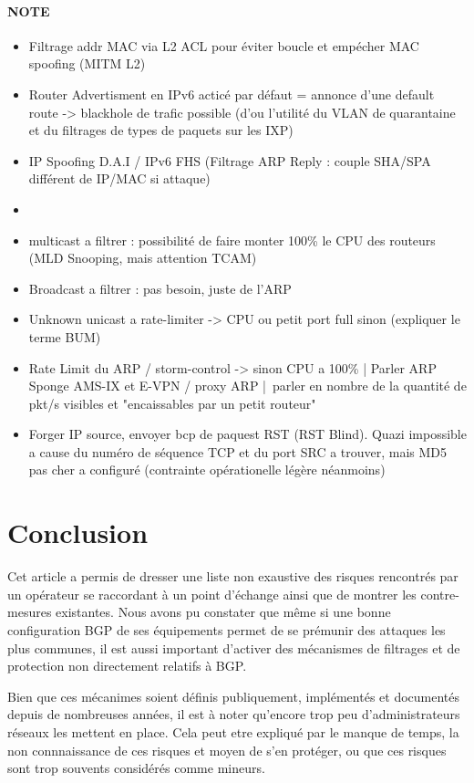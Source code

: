 \paragraph{NOTE}
\begin{itemize}
\item Filtrage addr MAC via L2 ACL pour éviter boucle et empécher MAC spoofing (MITM L2)
\item Router Advertisment en IPv6 acticé par défaut = annonce d'une default route -> blackhole de trafic possible (d'ou l'utilité du VLAN de quarantaine et du filtrages de types de paquets sur les IXP)
\item IP Spoofing D.A.I / IPv6 FHS (Filtrage ARP Reply : couple SHA/SPA différent de IP/MAC si attaque)
\item 
\item multicast a filtrer : possibilité de faire monter 100\% le CPU des routeurs (MLD Snooping, mais attention TCAM)
\item Broadcast a filtrer : pas besoin, juste de l'ARP
\item Unknown unicast a rate-limiter -> CPU ou petit port full sinon (expliquer le terme BUM)
\item Rate Limit du ARP / storm-control  -> sinon CPU a 100\% | Parler ARP Sponge AMS-IX et E-VPN / proxy ARP | parler en nombre de la quantité de pkt/s visibles et "encaissables par un petit routeur"
\item Forger IP source, envoyer bcp de paquest RST (RST Blind). Quazi impossible a cause du numéro de séquence TCP et du port SRC a trouver, mais MD5 pas cher a configuré (contrainte opérationelle légère néanmoins)

\end{itemize}


\section{Conclusion}

Cet article a permis de dresser une liste non exaustive des risques rencontrés par un opérateur se raccordant à un point d'échange ainsi que de montrer les contre-mesures existantes.
Nous avons pu constater que même si une bonne configuration BGP de ses équipements permet de se prémunir des attaques les plus communes, il est aussi important d'activer des mécanismes de filtrages et de protection non directement relatifs à BGP.

Bien que ces mécanimes soient définis publiquement, implémentés et documentés depuis de nombreuses années, il est à noter qu'encore trop peu d'administrateurs réseaux les mettent en place. Cela peut etre expliqué par le manque de temps, la non connnaissance de ces risques et moyen de s'en protéger, ou que ces risques sont trop souvents considérés comme mineurs.

